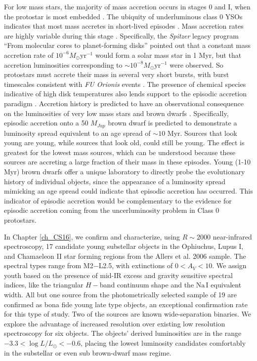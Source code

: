 For low mass stars, the majority of mass accretion occurs in stages 0 and I, when the protostar is most embedded \citep{2007ARA&A..45..565M,2014prpl.conf..195D}.  The ubiquity of underluminous class 0 YSOs indicates that most mass accretes in short-lived episodes \citep{2008ApJS..179..249D}.  Mass accretion rates are highly variable during this stage \citep{2006ApJ...650..956V,2009ApJ...702L..27B,2014prpl.conf..387A}.  Specifically, the \emph{Spitzer} legacy program ``From molecular cores to planet-forming disks'' \citep[][\emph{c2d}]{2009ApJS..181..321E} pointed out that a constant mass accretion rate of $10^{-6} M_{\odot}\mathrm{yr}^{-1}$ would form a solar mass star in 1 Myr, but that accretion luminosities corresponding to $\sim10^{-8} M_{\odot}\mathrm{yr}^{-1}$ were observed.  So protostars must accrete their mass in several very short bursts, with burst timescales consistent with \emph{FU Orionis} events \citep{2014prpl.conf..195D}.  The presence of chemical species indicative of high disk temperatures also lends support to the episodic accretion paradigm \citep{2012ApJ...754L..18V}.  Accretion history is predicted to have an observational consequence on the luminosities of very low mass stars and brown dwarfs \citep{2009ApJ...702L..27B,2011ApJ...730...32S}.  Specifically, episodic accretion onto a 50 $M_{Jup}$ brown dwarf is predicted to demonstrate a luminosity spread equivalent to an age spread of $\sim10$ Myr.  Sources that look young are young, while sources that look old, could still be young.  The effect is greatest for the lowest mass sources, which can be understood because these sources are accreting a large fraction of their mass in these episodes.  Young (1-10 Myr) brown dwarfs offer a unique laboratory to directly probe the evolutionary history of individual objects, since the appearance of a luminosity spread mimicking an age spread could indicate that episodic accretion has occurred.  This indicator of episodic accretion would be complementary to the evidence for episodic accretion coming from the uncerluminosity problem in Class 0 protostars.


In Chapter \ref{ch_CS16}, we confirm and characterize, using $R\sim 2000$ near-infrared spectroscopy, 17 candidate young substellar objects in the Ophiuchus, Lupus I, and Chamaeleon II star forming regions from the Allers et al. 2006 sample.  The spectral types range from M2$-$L2.5, with extinctions of $0 < A_V < 10$.  We assign youth based on the presence of mid-IR excess and gravity sensitive spectral indices, like the triangular $H-$band continuum shape and the $\mathrm{Na\, I}$ equivalent width.  All but one source from the photometrically selected sample of 19 are confirmed as bona fide young late type objects, an exceptional confirmation rate for this type of study.  Two of the sources are known wide-separation binaries.  We explore the advantage of increased resolution over existing low resolution spectroscopy for six objects.  The objects' derived luminosities are in the range $-3.3 < \log L/L_{\odot} < -0.6$, placing the lowest luminosity candidates comfortably in the substellar or even sub brown-dwarf mass regime.

